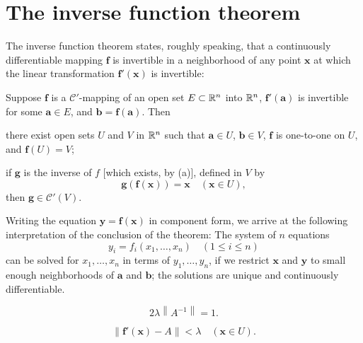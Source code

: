 \section{The inverse function theorem}

The inverse function theorem states, roughly speaking, that a continuously
differentiable mapping $\mathbf{f}$ is invertible in a neighborhood of any point $\mathbf{x}$ at which
the linear transformation $\mathbf{f'(x)}$ is invertible:

\begin{thm}
    \label{thm:9.24}
    Suppose $\mathbf{f}$ is a $\mathscr{C}'$-mapping of an open set $E \subset {\protect\mathbb R}^n$ into ${\protect\mathbb R}^n$, 
    $\mathbf{f'(a)}$ is invertible for some $\mathbf{a} \in E$, 
    and $\mathbf{b = f(a)}$. Then
    \begin{asparaenum}[(a)]
        \item there exist open sets $U$ and $V$ in ${\protect\mathbb R}^n$ 
        such that $\mathbf{a} \in U$, $\mathbf{b} \in V$, 
        $\mathbf{f}$ is one-to-one on $U$, and $\mathbf{f}(U) = V$;
        \item if $\mathbf{g}$ is the inverse of $f$ [which exists, by (a)], defined in $V$ by
        \begin{equation*}
            \mathbf{g(f(x)) = x}
            \quad
            (\mathbf{x} \in U),
        \end{equation*}
        then $\mathbf{g} \in \mathscr{C}'(V)$.
    \end{asparaenum}
\end{thm}

Writing the equation $\mathbf{y = f(x)}$ in component form, we arrive at the following interpretation of the conclusion of the theorem: 
The system of $n$ equations
\begin{equation*}
    y_i = f_i(x_1,\dots,x_n)
    \quad
    (1 \leq i \leq n)
\end{equation*}
can be solved for $x_1, \dots , x_n$ in terms of $y_1, \dots , y_n$, if we restrict $\mathbf{x}$ and $\mathbf{y}$ to small enough neighborhoods of $\mathbf{a}$ and $\mathbf{b}$; 
the solutions are unique and continuously
differentiable.


\begin{equation}
    \label{eq:9.46}
    2\lambda \left\| A^{-1} \right\| = 1.
\end{equation}

\begin{equation}
    \label{eq:9.47}
    \left\| \mathbf{f'(x)}-A \right\| < \lambda 
    \quad 
    (\mathbf{x} \in U).
\end{equation}

